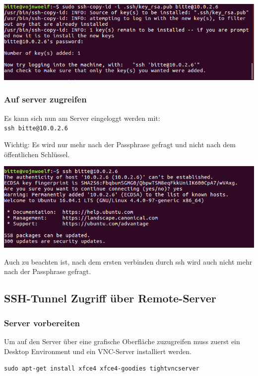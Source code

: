 \begin{minipage}{\linewidth}
	\centering
	\includegraphics[width=0.8\linewidth]{images/transfer_key}
\end{minipage}


\subsubsection{Auf server zugreifen}
Es kann sich nun am Server eingeloggt werden mit:\\\verb|ssh bitte@10.0.2.6|

Wichtig: Es wird nur mehr nach der Passphrase gefragt und nicht nach dem öffentlichen Schlüssel.

\begin{minipage}{\linewidth}
	\centering
	\includegraphics[width=0.8\linewidth]{images/access_server}
\end{minipage}

Auch zu beachten ist, nach dem ersten verbinden durch ssh wird auch nicht mehr nach der Passphrase gefragt.

\clearpage
\subsection{SSH-Tunnel Zugriff über Remote-Server}
\subsubsection{Server vorbereiten}
Um auf den Server über eine grafische Oberfläche zuzugreifen muss zuerst ein Desktop Environment und ein VNC-Server installiert werden.

\verb|sudo apt-get install xfce4 xfce4-goodies tightvncserver|

